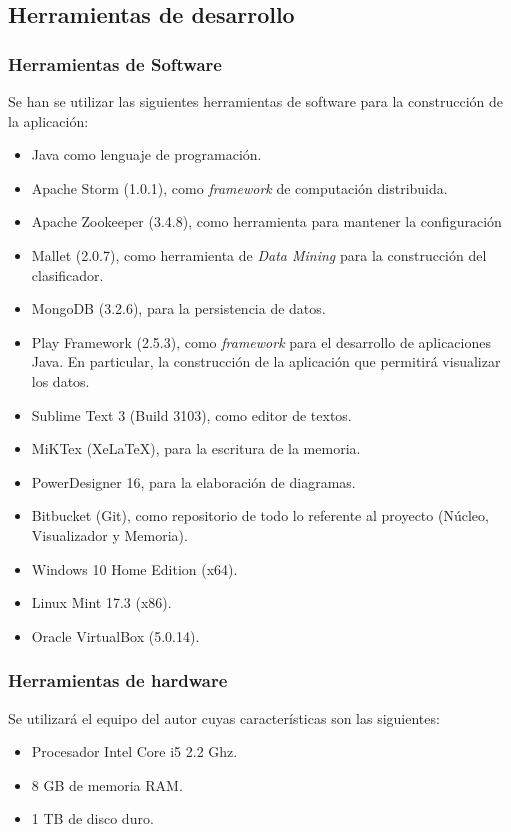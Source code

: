 \subsection{Herramientas de desarrollo}
\label{subsec:HerrDesarrollo}

\subsubsection{Herramientas de Software}
\label{subsubsec:HerrSoftware}

Se han se utilizar las siguientes herramientas de software para la construcción de la aplicación:\\

\begin{itemize}
\item Java como lenguaje de programación.
\item Apache Storm (1.0.1), como \textit{framework} de computación distribuida.
\item Apache Zookeeper (3.4.8), como herramienta para mantener la configuración
\item Mallet (2.0.7), como herramienta de \textit{Data Mining} para la construcción del clasificador.
\item MongoDB (3.2.6), para la persistencia de datos.
\item Play Framework (2.5.3), como \textit{framework} para el desarrollo de aplicaciones Java. En particular, la construcción de la aplicación que permitirá visualizar los datos. 
\item Sublime Text 3 (Build 3103), como editor de textos.
\item MiKTex (XeLaTeX), para la escritura de la memoria.
\item PowerDesigner 16, para la elaboración de diagramas.
\item Bitbucket (Git), como repositorio de todo lo referente al proyecto (Núcleo, Visualizador y Memoria).
\item Windows 10 Home Edition (x64).
\item Linux Mint 17.3 (x86).
\item Oracle VirtualBox (5.0.14).
\end{itemize}

\subsubsection{Herramientas de hardware}
\label{subsubsec:HerrHardw}

Se utilizará el equipo del autor cuyas características son las siguientes:\\
\begin{itemize}
\item Procesador Intel Core i5 2.2 Ghz.
\item 8 GB de memoria RAM.
\item 1 TB de disco duro.
\end{itemize}

